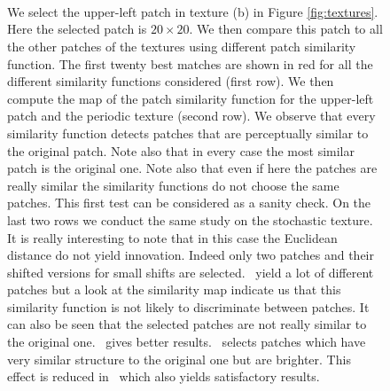 \begin{figure}[H]
  \centering
   \hfill
   \hfill
   \hfill
   \hfill
   \hfill \\
   \hfill
   \hfill
   \hfill
   \hfill
   \hfill \\
   \hfill
   \hfill
   \hfill
   \hfill
   \hfill \\
   \hfill
   \hfill
   \hfill
   \hfill
   \hfill
  \caption{We select the upper-left patch in texture (b) in Figure \ref{fig:textures}. Here the selected patch is $20 \times 20$. We then compare this patch to all the other patches of the textures using different patch similarity function. The first twenty best matches are shown in red for all the different similarity functions considered (first row). We then compute the map of the patch similarity function for the upper-left patch and the periodic texture (second row). We observe that every similarity function detects patches that are perceptually similar to the original patch. Note also that in every case the most similar patch is the original one. Note also that even if here the patches are really similar the similarity functions do not choose the same patches. This first test can be considered as a sanity check. On the last two rows we conduct the same study on the stochastic texture. It is really interesting to note that in this case the Euclidean distance do not yield innovation. Indeed only two patches and their shifted versions for small shifts are selected. \s{\infty} \ yield a lot of different patches but a look at the similarity map indicate us that this similarity function is not likely to discriminate between patches. It can also be seen that the selected patches are not really similar to the original one.  \ gives better results. \sps \ selects patches which have very similar structure to the original one but are brighter. This effect is reduced in \scos \ which also yields satisfactory results.}
  \label{fig:sim_func1}
\end{figure}
